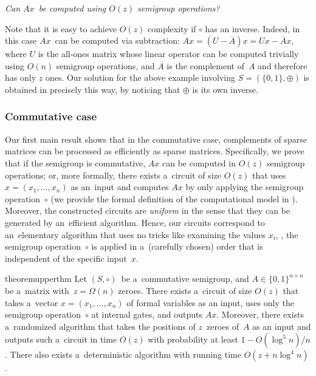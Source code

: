 \documentclass{toc}
\begin{document}
\vspace{2mm}
\emph{Can $Ax$~be computed using $O(z)$ semigroup operations?}
\vspace{2mm}

\noindent
Note that it is easy to achieve $O(z)$ complexity if $\circ$ has an inverse.
Indeed, in this case $Ax$~can be computed via subtraction:
$Ax = (U-\overline{A})x = Ux - \overline{A}x$, where $U$ is the all-ones matrix
whose linear operator can be computed trivially using $O(n)$ semigroup
operations, and $\overline{A}$ is the complement of~$A$ and therefore has only
$z$ ones. Our solution for the above example involving $S=(\{0,1\}, \oplus)$
is obtained in precisely this way, by noticing that $\oplus$ is its own inverse.

\subsubsection{Commutative case}
Our first main result shows that in the commutative case, complements
of sparse matrices can be processed as
efficiently as sparse matrices. Specifically, we prove
that if the semigroup is commutative, $Ax$ can be computed in $O(z)$ semigroup
operations; or, more formally, there exists
a~circuit of size $O(z)$ that uses $x=(x_1, \dotsc, x_n)$ as
an~input and computes $Ax$ by only applying the semigroup
operation~$\circ$ (we provide the formal definition of the
computational model in ). Moreover,
the constructed circuits are \emph{uniform} in the sense that they
can be generated by an~efficient algorithm. Hence, our circuits
correspond to an~elementary algorithm that uses no tricks like examining the
values $x_i$, \ie, the semigroup operation~$\circ$ is applied in a~(carefully
chosen) order that is independent of the specific input~$x$.

\begin{restatable}{theorem}{upperthm}
\label{thm:upperbound}
Let $(S, \circ)$~be a~commutative semigroup,
and $A \in \{0,1\}^{n \times n}$ be a~matrix
with~$z=\Omega(n)$ zeroes.
There exists a~circuit of size $O(z)$ that takes
a~vector $x = (x_1,\ldots, x_n)$ of formal variables as an input,
uses only the semigroup operation~$\circ$ at internal gates,
and outputs $Ax$. Moreover, there exists a~randomized
algorithm that takes the positions of $z$~zeroes of~$A$
as an input and outputs such a~circuit in time $O(z)$
with probability at least $1-O(\log^5n)/n$. There also
exists a~deterministic algorithm with running time $O(z+n\log^4n)$.
\end{restatable}
\end{document}
